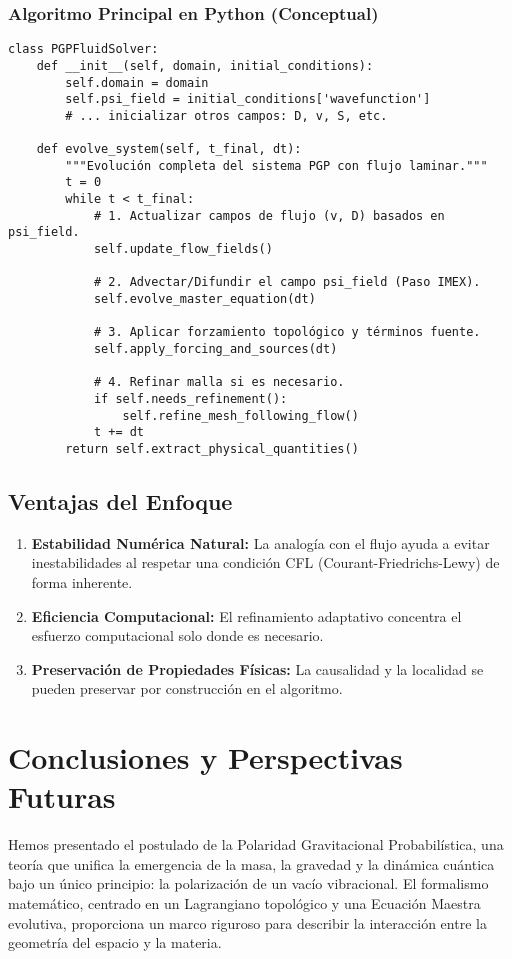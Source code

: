 \documentclass{book} %
\begin{document}
\subsection{Algoritmo Principal en Python (Conceptual)}
\begin{verbatim}
class PGPFluidSolver:
    def __init__(self, domain, initial_conditions):
        self.domain = domain
        self.psi_field = initial_conditions['wavefunction']
        # ... inicializar otros campos: D, v, S, etc.

    def evolve_system(self, t_final, dt):
        """Evolución completa del sistema PGP con flujo laminar."""
        t = 0
        while t < t_final:
            # 1. Actualizar campos de flujo (v, D) basados en psi_field.
            self.update_flow_fields()
            
            # 2. Advectar/Difundir el campo psi_field (Paso IMEX).
            self.evolve_master_equation(dt)

            # 3. Aplicar forzamiento topológico y términos fuente.
            self.apply_forcing_and_sources(dt)

            # 4. Refinar malla si es necesario.
            if self.needs_refinement():
                self.refine_mesh_following_flow()
            t += dt
        return self.extract_physical_quantities()
\end{verbatim}

\section{Ventajas del Enfoque}
\begin{enumerate}
    \item \textbf{Estabilidad Numérica Natural:} La analogía con el flujo ayuda a evitar inestabilidades al respetar una condición CFL (Courant-Friedrichs-Lewy) de forma inherente.
    \item \textbf{Eficiencia Computacional:} El refinamiento adaptativo concentra el esfuerzo computacional solo donde es necesario.
    \item \textbf{Preservación de Propiedades Físicas:} La causalidad y la localidad se pueden preservar por construcción en el algoritmo.
\end{enumerate}

\chapter{Conclusiones y Perspectivas Futuras}
Hemos presentado el postulado de la Polaridad Gravitacional Probabilística, una teoría que unifica la emergencia de la masa, la gravedad y la dinámica cuántica bajo un único principio: la polarización de un vacío vibracional. El formalismo matemático, centrado en un Lagrangiano topológico y una Ecuación Maestra evolutiva, proporciona un marco riguroso para describir la interacción entre la geometría del espacio y la materia.
\end{document}
